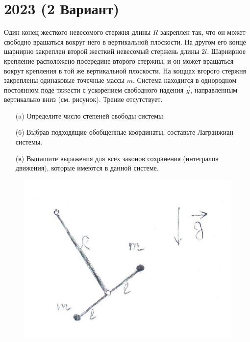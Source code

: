 \section{2023 (2 Вариант)}

\begin{prob}
Один конец жесткого невесомого стержня длины $R$ закреплен так, что он может свободно врашаться вокруг него в вертикальной плоскости. На другом его конце шарнирно закреплен второй жесткий невесомый стержень длины $2l$. Шарнирное крепление расположено посередине второго стержны, и он может вращаться вокрут крепления в той же вертикальной плоскости. На кощцах вгорого стержня закреплены одинаковые точечные массы $m$. Система находигся в однородном постоянном поде тяжести с ускорением свободного надения $\vec{g}$, направленным вертикально вниз (см. рисунок). Трение отсутствует.
\begin{itemize}
\item[]
\item[(a)] Определите число степеней свободы системы.
\item[(6)] Выбрав подходящие обобщенные координаты, составьте Лагранжиан системы.
\item[(в)] Выпишите выражения для всех законов сохранения (интегралов движения), которые имеются в данной системе.
\end{itemize}
\begin{figure}[h!]
\includegraphics[scale=0.55]{IMG/img_3}
\end{figure}
\end{prob}

